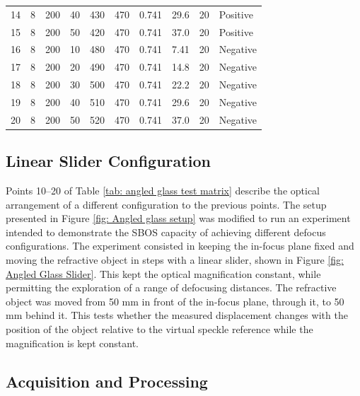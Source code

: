 \begin{table}[h]
\begin{tabular}{lrrrrrrrrl}
        14 & 8 & 200 & 40 & 430 & 470 & 0.741 & 29.6 & 20  & Positive \\
        15 & 8 & 200 & 50 & 420 & 470 & 0.741 & 37.0 & 20  & Positive \\
        16 & 8 & 200 & 10 & 480 & 470 & 0.741 &  7.41 & 20  & Negative \\
        17 & 8 & 200 & 20 & 490 & 470 & 0.741 & 14.8 & 20  & Negative \\
        18 & 8 & 200 & 30 & 500 & 470 & 0.741 & 22.2 & 20  & Negative \\
        19 & 8 & 200 & 40 & 510 & 470 & 0.741 & 29.6 & 20 & Negative \\
        20 & 8 & 200 & 50 & 520 & 470 & 0.741 & 37.0 & 20 & Negative \\
        \bottomrule
    \end{tabular}
\end{table}

\subsection{Linear Slider Configuration}
\label{subsection: angled glass slider}

Points 10--20 of Table \ref{tab: angled glass test matrix} describe the optical arrangement of a different configuration to the previous points. The setup presented in Figure \ref{fig: Angled glass setup} was modified to run an experiment intended to demonstrate the SBOS capacity of achieving different defocus configurations. The experiment consisted in keeping the in-focus plane fixed and moving the refractive object in steps with a linear slider, shown in Figure \ref{fig: Angled Glass Slider}. This kept the optical magnification constant, while permitting the exploration of a range of defocusing distances. The refractive object was moved from 50 mm in front of the in-focus plane, through it, to 50 mm behind it. This tests whether the measured displacement changes with the position of the object relative to the virtual speckle reference while the magnification is kept constant.

\subsection{Acquisition and Processing}
\label{subsection: angled glass acquisition}

